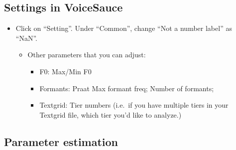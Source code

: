 \documentclass[
]{article}
\providecommand{\tightlist}{%
  \setlength{\itemsep}{0pt}\setlength{\parskip}{0pt}}
\begin{document}
\hypertarget{settings-in-voicesauce}{%
\subsection{Settings in VoiceSauce}\label{settings-in-voicesauce}}

\begin{itemize}
\tightlist
\item
  Click on ``Setting''. Under ``Common'', change ``Not a number label''
  as ``NaN''.

  \begin{itemize}
  \tightlist
  \item
    Other parameters that you can adjust:

    \begin{itemize}
    \tightlist
    \item
      F0: Max/Min F0
    \item
      Formants: Praat Max formant freq; Number of formants;
    \item
      Textgrid: Tier numbers (i.e.~if you have multiple tiers in your
      Textgrid file, which tier you'd like to analyze.)
    \end{itemize}
  \end{itemize}
\end{itemize}

\hypertarget{parameter-estimation}{%
\subsection{Parameter estimation}\label{parameter-estimation}}
\end{document}
